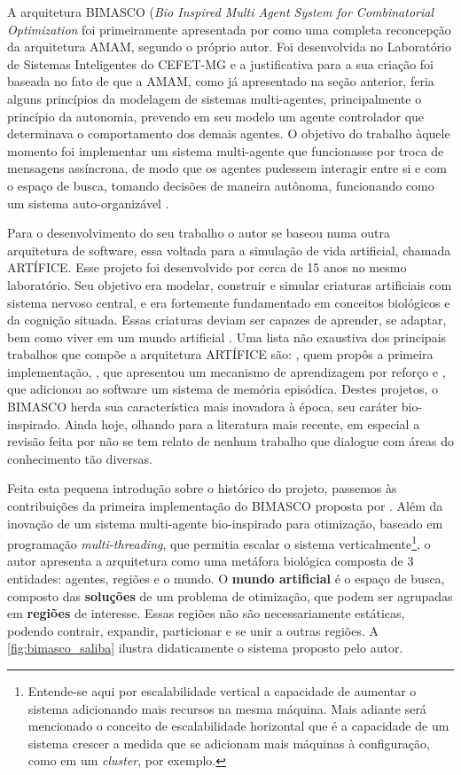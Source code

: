 A arquitetura BIMASCO (\textit{Bio Inspired Multi Agent System for Combinatorial Optimization} foi primeiramente apresentada por  como uma completa reconcepção da arquitetura AMAM, segundo o próprio autor. Foi desenvolvida no Laboratório de Sistemas Inteligentes do CEFET-MG e a justificativa para a sua criação foi baseada no fato de que a AMAM, como já apresentado na seção anterior, feria alguns princípios da modelagem de sistemas multi-agentes, principalmente o princípio da autonomia, prevendo em seu modelo um agente controlador que determinava o comportamento dos demais agentes. O objetivo do trabalho àquele momento foi implementar um sistema multi-agente que funcionasse por troca de mensagens assíncrona, de modo que os agentes pudessem interagir entre si e com o espaço de busca, tomando decisões de maneira autônoma, funcionando como um sistema auto-organizável \cite{saliba2010}. 

Para o desenvolvimento do seu trabalho o autor se baseou numa outra arquitetura de software, essa voltada para a simulação de vida artificial, chamada ARTÍFICE. Esse projeto foi desenvolvido por cerca de 15 anos no mesmo laboratório. Seu objetivo era modelar, construir e simular criaturas artificiais com sistema nervoso central, e era fortemente fundamentado em conceitos biológicos e da cognição situada. Essas criaturas deviam ser capazes de aprender, se adaptar, bem como viver em um mundo artificial \cite{santos2003}. Uma lista não exaustiva dos principais trabalhos que compõe a arquitetura ARTÍFICE são: , quem propôs a primeira implementação, , que apresentou um mecanismo de aprendizagem por reforço e , que adicionou ao software um sistema de memória episódica. 
Destes projetos, o BIMASCO herda sua característica mais inovadora à época, seu caráter bio-inspirado. Ainda hoje, olhando para a literatura mais recente, em especial a revisão feita por  não se tem relato de nenhum trabalho que dialogue com áreas do conhecimento tão diversas. 

Feita esta pequena introdução sobre o histórico do projeto, passemos às contribuições da primeira implementação do BIMASCO proposta por . Além da inovação de um sistema multi-agente bio-inspirado para otimização, baseado em programação \textit{multi-threading}, que permitia escalar o sistema verticalmente\footnote{Entende-se aqui por escalabilidade vertical a capacidade de aumentar o sistema adicionando mais recursos na mesma máquina. Mais adiante será mencionado o conceito de escalabilidade horizontal que é a capacidade de um sistema crescer a medida que se adicionam mais máquinas à configuração, como em um \textit{cluster}, por exemplo.}, o autor apresenta a arquitetura como uma metáfora biológica composta de 3 entidades: agentes, regiões e o mundo. O \textbf{mundo artificial} é o espaço de busca, composto das \textbf{soluções} de um problema de otimização, que podem ser agrupadas em \textbf{regiões} de interesse. Essas regiões não são necessariamente estáticas, podendo contrair, expandir, particionar e se unir a outras regiões. A \autoref{fig:bimasco_saliba} ilustra didaticamente o sistema proposto pelo autor. 

